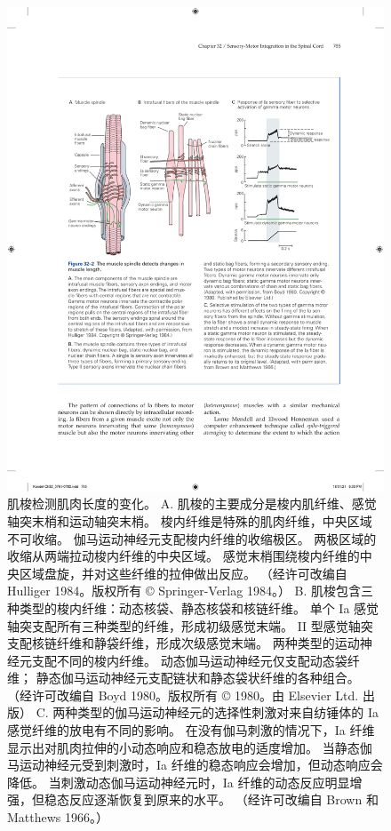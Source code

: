 \begin{figure}[htbp]
	\centering
	\includegraphics[width=0.9\linewidth]{chap32/fig_32_2}
	\caption{肌梭检测肌肉长度的变化。
		A. 肌梭的主要成分是梭内肌纤维、感觉轴突末梢和运动轴突末梢。
		梭内纤维是特殊的肌肉纤维，中央区域不可收缩。 伽马运动神经元支配梭内纤维的收缩极区。
		两极区域的收缩从两端拉动梭内纤维的中央区域。
		感觉末梢围绕梭内纤维的中央区域盘旋，并对这些纤维的拉伸做出反应。 （经许可改编自 Hulliger 1984。版权所有 © Springer-Verlag 1984。） 
		B. 肌梭包含三种类型的梭内纤维：动态核袋、静态核袋和核链纤维。
		单个 Ia 感觉轴突支配所有三种类型的纤维，形成初级感觉末端。
		II 型感觉轴突支配核链纤维和静袋纤维，形成次级感觉末端。
		两种类型的运动神经元支配不同的梭内纤维。
		动态伽马运动神经元仅支配动态袋纤维； 静态伽马运动神经元支配链状和静态袋状纤维的各种组合。 （经许可改编自 Boyd 1980。版权所有 © 1980。由 Elsevier Ltd. 出版） C. 两种类型的伽马运动神经元的选择性刺激对来自纺锤体的 Ia 感觉纤维的放电有不同的影响。 在没有伽马刺激的情况下，Ia 纤维显示出对肌肉拉伸的小动态响应和稳态放电的适度增加。 当静态伽马运动神经元受到刺激时，Ia 纤维的稳态响应会增加，但动态响应会降低。 当刺激动态伽马运动神经元时，Ia 纤维的动态反应明显增强，但稳态反应逐渐恢复到原来的水平。 （经许可改编自 Brown 和 Matthews 1966。）}
	\label{fig:32_2}
\end{figure}



